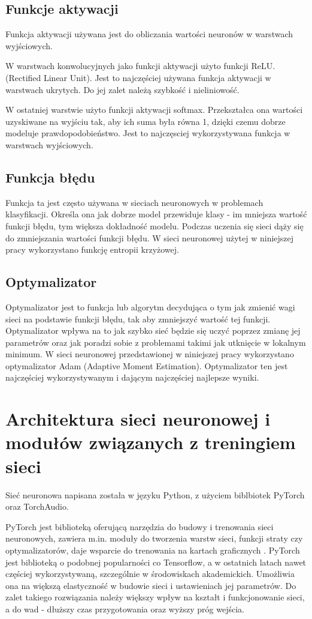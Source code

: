 \documentclass{sprz}
\begin{document}
\subsection{Funkcje aktywacji}
Funkcja aktywacji używana jest do obliczania wartości neuronów w warstwach wyjściowych.

W warstwach konwolucyjnych jako funkcji aktywacji użyto funkcji ReLU. (Rectified Linear Unit). Jest to najczęściej używana funkcja aktywacji w warstwach ukrytych. Do jej zalet należą szybkość i nieliniowość.

W ostatniej warstwie użyto funkcji aktywacji softmax. Przekształca ona wartości uzyskiwane na wyjściu tak, aby ich suma była równa 1, dzięki czemu dobrze modeluje prawdopodobieństwo. Jest to najczęsciej wykorzystywana funkcja w warstwach wyjściowych.

\subsection{Funkcja błędu}
Funkcja ta jest często używana w sieciach neuronowych w problemach klasyfikacji. Określa ona jak dobrze model przewiduje klasy - im mniejsza wartość funkcji błędu, tym większa dokładność modelu. Podczas uczenia się sieci dąży się do zmniejszania wartości funkcji błędu. W sieci neuronowej użytej w niniejszej pracy wykorzystano funkcję entropii krzyżowej.

\subsection{Optymalizator}
Optymalizator jest to funkcja lub algorytm decydująca o tym jak zmienić wagi sieci na podstawie funkcji błędu, tak aby zmniejszyć wartość tej funkcji. Optymalizator wpływa na to jak szybko sieć będzie się uczyć poprzez zmianę jej parametrów oraz jak poradzi sobie z problemami takimi jak utknięcie w lokalnym minimum. W sieci neuronowej przedstawionej w niniejszej pracy wykorzystano optymalizator Adam (Adaptive Moment Estimation). Optymalizator ten jest najczęściej wykorzystywanym i dającym najczęściej najlepsze wyniki.

\section{Architektura sieci neuronowej i modułów związanych z treningiem sieci}
Sieć neuronowa napisana została w języku Python, z użyciem biblbiotek PyTorch oraz TorchAudio. 

PyTorch jest biblioteką oferującą narzędzia do budowy i trenowania sieci neuronowych, zawiera m.in. moduły do tworzenia warstw sieci, funkcji straty czy optymalizatorów, daje wsparcie do trenowania na kartach graficznych \cite{pytorch}.
PyTorch jest biblioteką o podobnej popularności co Tensorflow, a w ostatnich latach nawet częściej wykorzystywaną, szczególnie w środowiskach akademickich. Umożliwia ona na większą elastyczność w budowie sieci i ustawieniach jej parametrów. Do zalet takiego rozwiązania należy większy wpływ na kształt i funkcjonowanie sieci, a do wad - dłuższy czas przygotowania oraz wyższy próg wejścia. 
\end{document}
